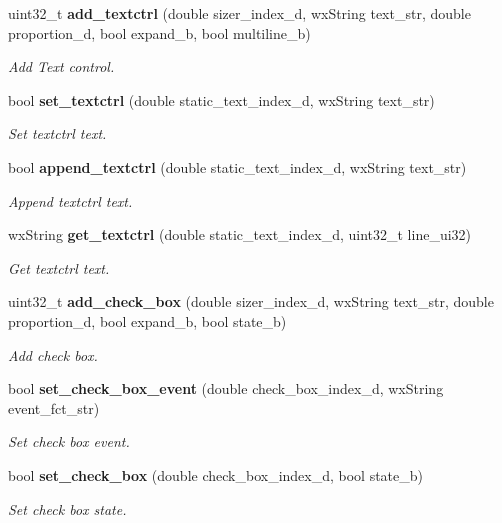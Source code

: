 \begin{DoxyCompactItemize}
uint32\+\_\+t \textbf{ add\+\_\+textctrl} (double sizer\+\_\+index\+\_\+d, wx\+String text\+\_\+str, double proportion\+\_\+d, bool expand\+\_\+b, bool multiline\+\_\+b)
\begin{DoxyCompactList}\small\item\em Add Text control. \end{DoxyCompactList}\item 
bool \textbf{ set\+\_\+textctrl} (double static\+\_\+text\+\_\+index\+\_\+d, wx\+String text\+\_\+str)
\begin{DoxyCompactList}\small\item\em Set textctrl text. \end{DoxyCompactList}\item 
bool \textbf{ append\+\_\+textctrl} (double static\+\_\+text\+\_\+index\+\_\+d, wx\+String text\+\_\+str)
\begin{DoxyCompactList}\small\item\em Append textctrl text. \end{DoxyCompactList}\item 
wx\+String \textbf{ get\+\_\+textctrl} (double static\+\_\+text\+\_\+index\+\_\+d, uint32\+\_\+t line\+\_\+ui32)
\begin{DoxyCompactList}\small\item\em Get textctrl text. \end{DoxyCompactList}\item 
uint32\+\_\+t \textbf{ add\+\_\+check\+\_\+box} (double sizer\+\_\+index\+\_\+d, wx\+String text\+\_\+str, double proportion\+\_\+d, bool expand\+\_\+b, bool state\+\_\+b)
\begin{DoxyCompactList}\small\item\em Add check box. \end{DoxyCompactList}\item 
bool \textbf{ set\+\_\+check\+\_\+box\+\_\+event} (double check\+\_\+box\+\_\+index\+\_\+d, wx\+String event\+\_\+fct\+\_\+str)
\begin{DoxyCompactList}\small\item\em Set check box event. \end{DoxyCompactList}\item 
bool \textbf{ set\+\_\+check\+\_\+box} (double check\+\_\+box\+\_\+index\+\_\+d, bool state\+\_\+b)
\begin{DoxyCompactList}\small\item\em Set check box state. \end{DoxyCompactList}\item 

\end{DoxyCompactItemize}
